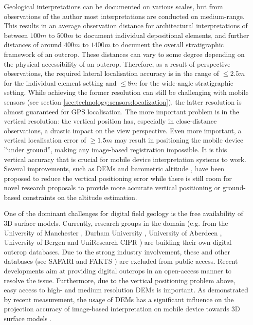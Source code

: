 \documentclass[review]{elsarticle}
\begin{document}
Geological interpretations can be documented on various scales, but from observations of the author most interpretations are conducted on medium-range. This results in an average observation distance for architectural interpretations of between $100m$ to $500m$ to document individual depositional elements, and further distances of around $400m$ to $1400m$ to document the overall stratigraphic framework of an outcrop. These distances can vary to some degree depending on the physical accessibility of an outcrop. Therefore, as a result of perspective observations, the required lateral localisation accuracy is in the range of $\leq 2.5m$ for the individual element setting and $\leq 8m$ for the wide-angle stratigraphic setting. While achieving the former resolution can still be challenging with mobile sensors (see section \ref{sec:technology:sensors:localization}), the latter resolution is almost guaranteed for \gls{GPS} localisation. The more important problem is in the vertical resolution: the vertical position has, especially in close-distance observations, a drastic impact on the view perspective. Even more important, a vertical localisation error of  $\geq 1.5m$ may result in positioning the mobile device ''under ground'', making any image-based registration impossible. It is this vertical accuracy that is crucial for mobile device interpretation systems to work. Several improvements, such as \glspl{DEM} and barometric altitude \cite{Kehl2017_VGC}, have been proposed to reduce the vertical positioning error while there is still room for novel research proposals to provide more accurate vertical positioning or ground-based constraints on the altitude estimation.

One of the dominant challenges for digital field geology is the free availability of 3D surface models. Currently, research groups in the domain (e.g. from the University of Manchester \cite{Hodgetts2013}, Durham University \cite{McCaffrey2005}, University of Aberdeen \cite{Howell2014}, University of Bergen and UniResearch CIPR \cite{Dreyer1993}) are building their own digital outcrop databases. Due to the strong industry involvement, these and other databases (see SAFARI \cite{Dreyer1993} and FAKTS \cite{Colombera2012a}) are excluded from public access. Recent developments aim at providing digital outcrops in an open-access manner \cite{Cawood2018} to resolve the issue. Furthermore, due to the vertical positioning problem above, easy access to high- and medium resolution \glspl{DEM} is important. As demonstrated by recent measurement, the usage of \glspl{DEM} has a significant influence on the projection accuracy of image-based interpretation on mobile device towards 3D surface models \cite{Kehl2017_VGC}.
\end{document}
